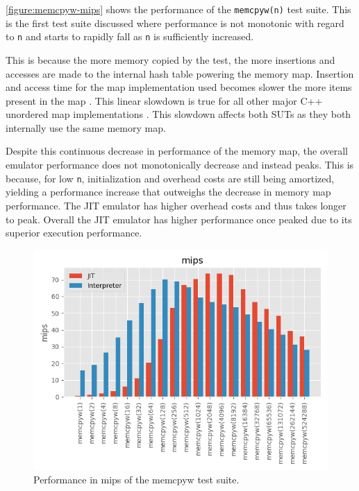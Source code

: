 \autoref{figure:memcpyw-mips} shows the performance of the \texttt{memcpyw(n)} test suite. This is the first test suite discussed where performance is not monotonic with regard to \texttt{n} and starts to rapidly fall as \texttt{n} is sufficiently increased.

This is because the more memory copied by the test, the more insertions and accesses are made to the internal hash table powering the memory map. Insertion and access time for the map implementation used becomes slower the more items present in the map \cite{tessil-benchmark}. This linear slowdown is true for all other major C++ unordered map implementations \cite{tessil-benchmark}. This slowdown affects both SUTs as they both internally use the same memory map.

Despite this continuous decrease in performance of the memory map, the overall emulator performance does not monotonically decrease and instead peaks. This is because, for low \texttt{n}, initialization and overhead costs are still being amortized, yielding a performance increase that outweighs the decrease in memory map performance. The JIT emulator has higher overhead costs and thus takes longer to peak. Overall the JIT emulator has higher performance once peaked due to its superior execution performance.

\begin{figure}
    \centering
    \includegraphics{output/graphs/tests/memcpyw/mips.png}
    \caption{Performance in mips of the memcpyw test suite.}
    \label{figure:memcpyw-mips}
\end{figure}
